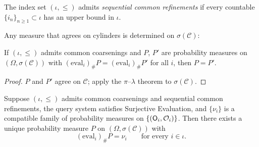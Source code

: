 \begin{definition}
The index set $(\iota, \leq)$ admits \emph{sequential common refinements}
if every countable $\{i_n\}_{n \geq 1} \subset \iota$ has an upper bound
in $\iota$.
\end{definition}

\noindent Any measure that agrees on cylinders is determined on
$\sigma(\mathcal{C})$:

\begin{lemma}
\label{I:thm:obs-determination}
If $(\iota, \leq)$ admits common coarsenings and $P$, $P'$ are
probability measures on $(\Omega, \sigma(\mathcal{C}))$ with
$(\mathrm{eval}_i)_\# P = (\mathrm{eval}_i)_\# P'$ for all $i$, then
$P = P'$.
\end{lemma}

\begin{proof}
$P$ and $P'$ agree on $\mathcal{C}$; apply the $\pi$--$\lambda$ theorem
to $\sigma(\mathcal{C})$.
\end{proof}

\begin{theorem}
\label{I:thm:obs-extension}
Suppose $(\iota, \leq)$ admits common coarsenings and sequential common
refinements, the query system satisfies Surjective Evaluation, and
$\{\nu_i\}$ is a compatible family of probability measures on
$\{(\mathsf{O}_{i}, \mathcal{O}_i)\}$.  Then there exists a unique probability
measure $P$ on $(\Omega, \sigma(\mathcal{C}))$ with
\[
  (\mathrm{eval}_i)_\# P = \nu_i
  \qquad \text{for every } i \in \iota.
\]
\end{theorem}

